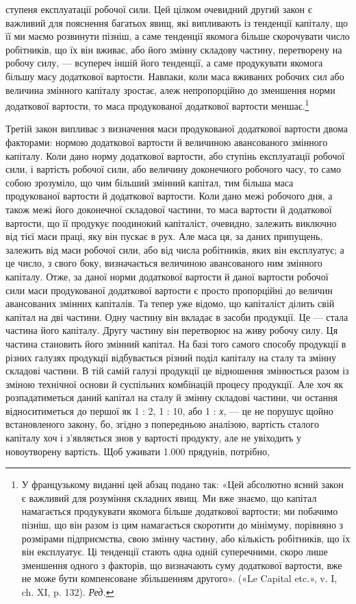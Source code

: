 \parcont{}  %
ступеня експлуатації робочої сили. Цей цілком очевидний другий
закон є важливий для пояснення багатьох явищ, які випливають
із тенденції капіталу, що її ми маємо розвинути пізніш,
а саме тенденції якомога більше скорочувати число робітників,
що їх він вживає, або його змінну складову частину, перетворену
на робочу силу, — всупереч іншій його тенденції, а саме продукувати
якомога більшу масу додаткової вартости. Навпаки, коли
маса вживаних робочих сил або величина змінного капіталу
зростає, алеж непропорційно до зменшення норми додаткової
вартости, то маса продукованої додаткової вартости меншає.\footnote*{
У французькому виданні цей абзац подано так: «Цей абсолютно
ясний закон є важливий для розуміння складних явищ. Ми вже знаємо,
що капітал намагається продукувати якомога більше додаткової вартости;
ми побачимо пізніш, що він разом із цим намагається скоротити до
мінімуму, порівняно з розмірами підприємства, свою змінну частину,
або кількість робітників, що їх він експлуатує. Ці тенденції стають одна
одній суперечними, скоро лише зменшення одного з факторів, що визначають
суму додаткової вартости, вже не може бути компенсоване збільшенням
другого». («Le Capital etc.», v. I, ch. XI, p. 132). \emph{Ред.}
}

Третій закон випливає з визначення маси продукованої додаткової
вартости двома факторами: нормою додаткової вартости й
величиною авансованого змінного капіталу. Коли дано норму
додаткової вартости, або ступінь експлуатації робочої сили,
і вартість робочої сили, або величину доконечного робочого
часу, то само собою зрозуміло, що чим більший змінний капітал,
тим більша маса продукованої вартости й додаткової вартости.
Коли дано межі робочого дня, а також межі його доконечної
складової частини, то маса вартости й додаткової вартости,
що її продукує поодинокий капіталіст, очевидно, залежить
виключно від тієї маси праці, яку він пускає в рух. Але
маса ця, за даних припущень, залежить від маси робочої сили,
або від числа робітників, яких він експлуатує; а це число, з
свого боку, визначається величиною авансованого ним змінного
капіталу. Отже, за даної норми додаткової вартости й даної вартости
робочої сили маси продукованої додаткової вартости є
просто пропорційні до величин авансованих змінних капіталів.
Та тепер уже відомо, що капіталіст ділить свій капітал на
дві частини. Одну частину він вкладає в засоби продукції. Це —
стала частина його капіталу. Другу частину він перетворює на
живу робочу силу. Ця частина становить його змінний капітал.
На базі того самого способу продукції в різних галузях продукції
відбувається різний поділ капіталу на сталу та змінну складові
частини. В тій самій галузі продукції це відношення змінюється
разом із зміною технічної основи й суспільних комбінацій процесу
продукції. Але хоч як розпадатиметься даний капітал на сталу
й змінну складові частини, чи остання відноситиметься до першої
як 1 : 2, 1 : 10, або 1 : \emph{х}, — це не порушує щойно встановленого
закону, бо, згідно з попередньою аналізою, вартість сталого капіталу
хоч і з’являється знов у вартості продукту, але не увіходить
у новоутворену вартість. Щоб уживати 1.000 прядунів, потрібно,
\parbreak{}  %
